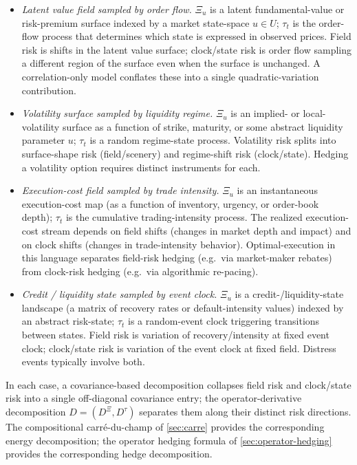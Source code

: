 \documentclass[11pt,reqno]{amsart}
\theoremstyle{plain}
\theoremstyle{definition}
\theoremstyle{remark}
\begin{document}
\begin{itemize}
\item \emph{Latent value field sampled by order flow.}
$\Xi_{u}$ is a latent fundamental-value or risk-premium surface
indexed by a market state-space $u\in U$; $\tau_{t}$ is the
order-flow process that determines which state is expressed in
observed prices. Field risk is shifts in the latent value
surface; clock/state risk is order flow sampling a different
region of the surface even when the surface is unchanged. A
correlation-only model conflates these into a single
quadratic-variation contribution.
\item \emph{Volatility surface sampled by liquidity regime.}
$\Xi_{u}$ is an implied- or local-volatility surface as a
function of strike, maturity, or some abstract liquidity
parameter $u$; $\tau_{t}$ is a random regime-state process.
Volatility risk splits into surface-shape risk
(field/scenery) and regime-shift risk (clock/state). Hedging a
volatility option requires distinct instruments for each.
\item \emph{Execution-cost field sampled by trade intensity.}
$\Xi_{u}$ is an instantaneous execution-cost map (as a function
of inventory, urgency, or order-book depth); $\tau_{t}$ is the
cumulative trading-intensity process. The realized
execution-cost stream depends on field shifts (changes in
market depth and impact) and on clock shifts (changes in
trade-intensity behavior). Optimal-execution in this language
separates field-risk hedging (e.g.\ via market-maker rebates)
from clock-risk hedging (e.g.\ via algorithmic re-pacing).
\item \emph{Credit / liquidity state sampled by event clock.}
$\Xi_{u}$ is a credit-/liquidity-state landscape (a matrix of
recovery rates or default-intensity values) indexed by an
abstract risk-state; $\tau_{t}$ is a random-event clock
triggering transitions between states. Field risk is variation
of recovery/intensity at fixed event clock; clock/state risk is
variation of the event clock at fixed field. Distress events
typically involve both.
\end{itemize}

In each case, a covariance-based decomposition collapses field
risk and clock/state risk into a single off-diagonal covariance
entry; the operator-derivative decomposition
$D=(D^{\Xi},D^{\tau})$ separates them along their distinct
risk directions. The compositional carr\'e-du-champ
of \cref{sec:carre} provides the corresponding energy
decomposition; the operator hedging formula
of \cref{sec:operator-hedging} provides the corresponding
hedge decomposition.
\end{document}
